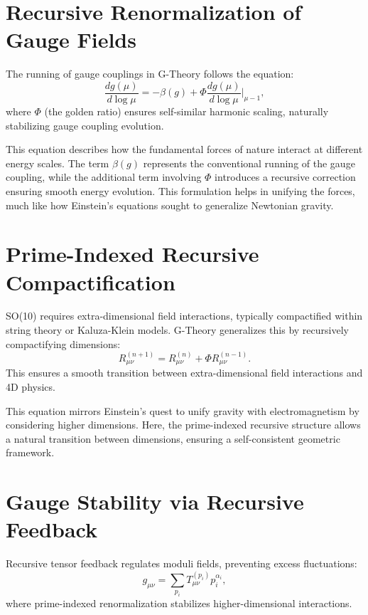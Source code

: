 \documentclass{article}
\begin{document}
\section{Recursive Renormalization of Gauge Fields}
The running of gauge couplings in G-Theory follows the equation:
\begin{equation}
    \frac{d g(\mu)}{d \log \mu} = -\beta(g) + \Phi \frac{d g(\mu)}{d \log \mu} \bigg|_{\mu - 1},
\end{equation}
where $\Phi$ (the golden ratio) ensures self-similar harmonic scaling, naturally stabilizing gauge coupling evolution.

This equation describes how the fundamental forces of nature interact at different energy scales. The term $\beta(g)$ represents the conventional running of the gauge coupling, while the additional term involving $\Phi$ introduces a recursive correction ensuring smooth energy evolution. This formulation helps in unifying the forces, much like how Einstein's equations sought to generalize Newtonian gravity.

\section{Prime-Indexed Recursive Compactification}
SO(10) requires extra-dimensional field interactions, typically compactified within string theory or Kaluza-Klein models. G-Theory generalizes this by recursively compactifying dimensions:
\begin{equation}
    R_{\mu\nu}^{(n+1)} = R_{\mu\nu}^{(n)} + \Phi R_{\mu\nu}^{(n-1)}.
\end{equation}
This ensures a smooth transition between extra-dimensional field interactions and 4D physics.

This equation mirrors Einstein’s quest to unify gravity with electromagnetism by considering higher dimensions. Here, the prime-indexed recursive structure allows a natural transition between dimensions, ensuring a self-consistent geometric framework.

\section{Gauge Stability via Recursive Feedback}
Recursive tensor feedback regulates moduli fields, preventing excess fluctuations:
\begin{equation}
    g_{\mu\nu} = \sum_{p_i} T_{\mu\nu}^{(p_i)} p_i^{\alpha_i},
\end{equation}
where prime-indexed renormalization stabilizes higher-dimensional interactions.
\end{document}
